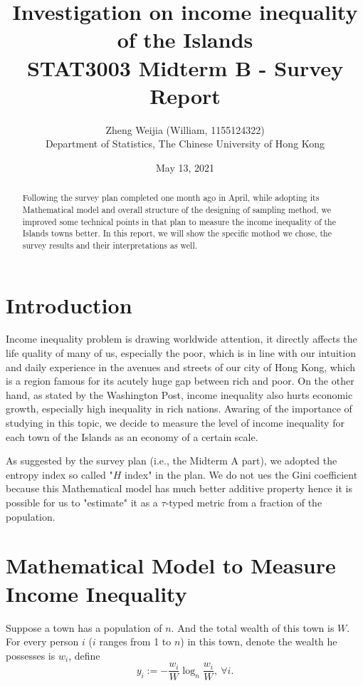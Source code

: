 \documentclass[12pt]{article}%
\begin{document}

\title{
Investigation on income inequality of the Islands\\
\Large STAT3003 Midterm B - Survey Report}
\author{Zheng Weijia (William, 1155124322) \\
Department of Statistics,
The Chinese University of Hong Kong}
\date{May 13, 2021}
\maketitle

\begin{abstract}
    Following the survey plan completed one month ago in April, 
    while adopting its Mathematical model and 
    overall structure of the designing of sampling method, 
    we improved some technical points in that plan 
    to measure the income inequality of the Islands towns better. 
    In this report, we will show the specific mothod we chose, 
    the survey results and their interpretations as well.

\end{abstract}

\section{Introduction}
Income inequality problem is drawing worldwide attention, 
it directly affects the life quality of many of us, especially the poor, 
which is in line with our intuition and daily experience 
in the avenues and streets of our city of Hong Kong, 
which is a region famous for its acutely huge gap between rich and poor.
On the other hand, as stated by the Washington Post, income inequality also
hurts economic growth, especially high inequality in rich nations. 
Awaring of the importance of studying in this topic,
we decide to measure the level of income inequality 
for each town of the Islands as an economy of a certain scale. 

As suggested by the survey plan (i.e., the Midterm A part), 
we adopted the entropy index so called "$H$ index" in the plan. 
We do not ues the Gini coefficient because 
this Mathematical model has much better additive property hence 
it is possible for us to "estimate" it 
as a $\tau$-typed metric from a fraction of the population.


\section{Mathematical Model to Measure Income Inequality}
Suppose a town has a population of $n$. 
And the total wealth of this town is $W$. 
For every person $i$ ($i$ ranges from 1 to $n$) in this town, 
denote the wealth he possesses is $w_i$, define 
$$y_i := -\frac{w_i}{W}\log_{n}{ \frac{w_i}{W} } ,~ \forall i.$$
\end{document}
